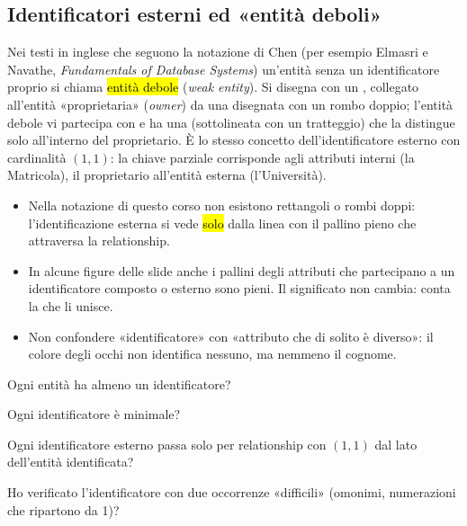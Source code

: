 \subsection{Identificatori esterni ed «entità deboli»}

\begin{mlbox}
Nei testi in inglese che seguono la notazione di Chen (per esempio Elmasri e Navathe, \emph{Fundamentals of Database Systems}) un'entità senza un identificatore proprio si chiama \hl{entità debole} (\emph{weak entity}). Si disegna con un , collegato all'entità «proprietaria» (\emph{owner}) da una  disegnata con un rombo doppio; l'entità debole vi partecipa con  e ha una  (sottolineata con un tratteggio) che la distingue solo all'interno del proprietario. È lo stesso concetto dell'identificatore esterno con cardinalità $(1,1)$: la chiave parziale corrisponde agli attributi interni (la Matricola), il proprietario all'entità esterna (l'Università).
\end{mlbox}

\begin{attenzione}
\begin{itemize}
  \item Nella notazione di questo corso non esistono rettangoli o rombi doppi: l'identificazione esterna si vede \hl{solo} dalla linea con il pallino pieno che attraversa la relationship.
  \item In alcune figure delle slide anche i pallini degli attributi che partecipano a un identificatore composto o esterno sono pieni. Il significato non cambia: conta la  che li unisce.
  \item Non confondere «identificatore» con «attributo che di solito è diverso»: il colore degli occhi non identifica nessuno, ma nemmeno il cognome.
\end{itemize}
\end{attenzione}

\begin{consiglio}
\begin{passi}
  \item Ogni entità ha almeno un identificatore?
  \item Ogni identificatore è minimale?
  \item Ogni identificatore esterno passa solo per relationship con $(1,1)$ dal lato dell'entità identificata?
  \item Ho verificato l'identificatore con due occorrenze «difficili» (omonimi, numerazioni che ripartono da 1)?
\end{passi}
\end{consiglio}

